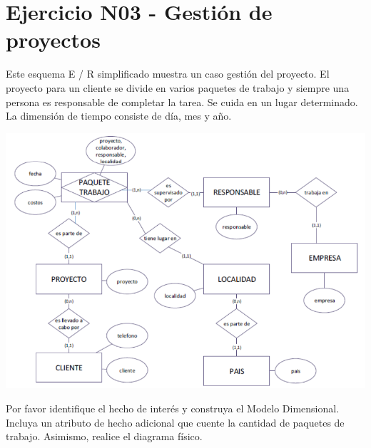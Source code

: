 \section{Ejercicio N03 - Gestión de proyectos } 

Este esquema E / R simplificado muestra un caso gestión del proyecto.
El proyecto para un cliente se divide en varios paquetes de trabajo y siempre una persona es responsable de completar la
tarea. Se cuida en un lugar determinado.
La dimensión de tiempo consiste de día, mes y año.


	\begin{center}
	\includegraphics[width=17cm]{./Imagenes/ejercicio3}
	\end{center}	

Por favor identifique el hecho de interés y construya el Modelo Dimensional. Incluya un atributo de hecho adicional que
cuente la cantidad de paquetes de trabajo. Asimismo, realice el diagrama físico.
\\

